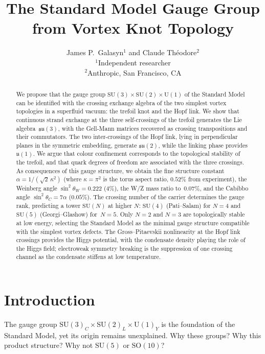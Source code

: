 \documentclass[11pt,a4paper]{article}
\title{\textbf{The Standard Model Gauge Group\\
from Vortex Knot Topology}}
\author{
  James P.\ Galasyn$^{1}$ and Claude Th\'eodore$^{2}$ \\[6pt]
  \small $^{1}$Independent researcher \\
  \small $^{2}$Anthropic, San Francisco, CA
}
\date{}
\begin{document}
\maketitle

\begin{abstract}
We propose that the gauge group $\mathrm{SU}(3) \times
\mathrm{SU}(2) \times \mathrm{U}(1)$ of the Standard Model
can be identified with the crossing exchange algebra of the two
simplest vortex topologies in a superfluid vacuum: the trefoil
knot and the Hopf link.  We show that continuous strand exchange
at the three self-crossings of the trefoil generates the Lie
algebra~$\mathfrak{su}(3)$, with the Gell-Mann matrices
recovered as crossing transpositions and their commutators.
The two inter-crossings of the Hopf link, lying in perpendicular
planes in the symmetric embedding, generate $\mathfrak{su}(2)$,
while the linking phase provides $\mathfrak{u}(1)$.  We argue
that colour confinement corresponds to the topological
stability of the trefoil, and that quark degrees of freedom
are associated with the three crossings.  As consequences of this gauge structure, we obtain
the fine structure constant
$\alpha = 1/(\sqrt{2}\,\kappa^2)$
(where $\kappa = \pi^2$ is the torus aspect ratio,
$0.52\%$ from experiment), the Weinberg angle
$\sin^2\theta_W = 0.222$ ($4\%$), the W/Z mass
ratio to~$0.07\%$, and the Cabibbo angle
$\sin^2\theta_C = 7\alpha$ ($0.05\%$).  The crossing number
of the carrier determines the gauge rank, predicting a tower
$\mathrm{SU}(N)$ at higher $N$: $\mathrm{SU}(4)$ (Pati--Salam)
for $N=4$ and $\mathrm{SU}(5)$ (Georgi--Glashow) for~$N=5$.
Only $N=2$ and $N=3$ are topologically stable at low energy,
selecting the Standard Model as the minimal gauge structure
compatible with the simplest vortex defects.  The
Gross--Pitaevskii nonlinearity at the Hopf link crossings
provides the Higgs potential, with the condensate density
playing the role of the Higgs field; electroweak symmetry
breaking is the suppression of one crossing channel as the
condensate stiffens at low temperature.
\end{abstract}


\section{Introduction}
\label{sec:intro}

The gauge group $\mathrm{SU}(3)_C \times \mathrm{SU}(2)_L \times
\mathrm{U}(1)_Y$ is the foundation of the Standard Model, yet
its origin remains unexplained.  Why these groups?  Why this
product structure?  Why not $\mathrm{SU}(5)$ or $\mathrm{SO}(10)$?
\end{document}

